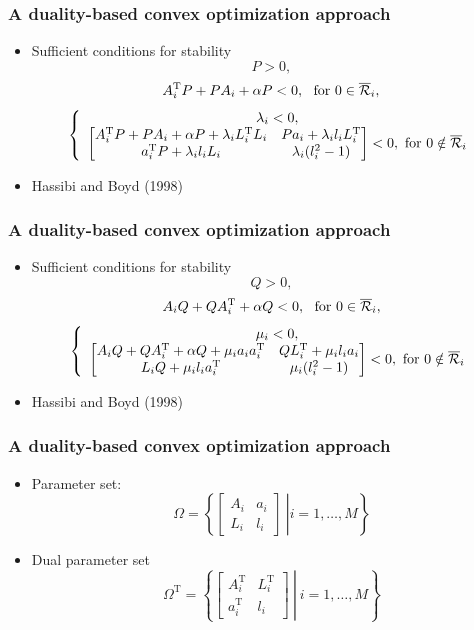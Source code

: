 \documentclass{beamer}
\newcommand{\TR}{\text{T}}
\newcommand{\RR}{{\cal R}}
\newcommand{\beq}{\begin{equation*}}
\newcommand{\eeq}{\end{equation*}}
\newcommand{\bmat}{\left[\begin{array}}
\newcommand{\emat}{\end{array}\right]}
\begin{document}
  \frame
  {
    \frametitle{A duality-based convex optimization approach}
    \begin{itemize}
\item Sufficient conditions for stability
\beq
P>0,
\eeq
\beq
A^\TR_{i}P+PA_{i}+\alpha P<0,\ \text{ for } 0\in \overline\RR_i,
\eeq
\beq
\left\{\begin{array}{c}
\lambda_{i}< 0,\\
	\left[\begin{matrix}
A^\TR_{i}P+PA_{i}+\alpha P+\lambda_{i}L_{i}^\TR L_{i}&Pa_{i}+\lambda_{i}l_{i}L_{i}^\TR \\
	a_{i}^\TR P+\lambda_{i}l_{i} L_{i}&\lambda_{i}(l_{i}^2-1)\\
	\end{matrix}\right]< 0, \text{ for } 0\notin \overline\RR_i
\end{array}\right.
\eeq
\item {Hassibi and Boyd (1998)}
\end{itemize}
}
  \frame
  {
    \frametitle{A duality-based convex optimization approach}
    \begin{itemize}
\item Sufficient conditions for stability
\beq
Q>0,
\eeq
\beq
A_{i}Q+QA^\TR_{i}+\alpha Q<0,\  \text{ for } 0\in \overline\RR_i,
\eeq
\beq
\left\{\begin{array}{c}
\mu_{i}< 0,\\
	\left[\begin{matrix}
A_{i}Q+QA^\TR_{i}+\alpha Q+\mu_{i}a_{i} a_{i}^\TR&QL_{i}^\TR+\mu_{i}l_{i}a_{i}\\
	L_{i}Q+\mu_{i}l_{i} a_{i}^\TR&\mu_{i}(l_{i}^2-1)\\
	\end{matrix}\right]< 0,\text{ for } 0\notin \overline\RR_i
	\end{array}\right. 
\eeq
\item {Hassibi and Boyd (1998)}
\end{itemize}
}

  \frame
  {
    \frametitle{A duality-based convex optimization approach}
    \begin{itemize}
    \item Parameter set:
\beq
\Omega =\left\{ \left.\bmat{cc}A_{i}&a_{i}\\L_i&l_i\emat\ \right| i=1,\ldots,M \right\}
\eeq
\item Dual parameter set
\beq
\Omega^\TR =\left\{ \left.\bmat{cc}A_{i}^\TR&L_i^\TR\\a_{i}^\TR&l_i\emat\ \right|\ i=1,\ldots,M\right\}
\eeq
\end{itemize}
}
\end{document}
